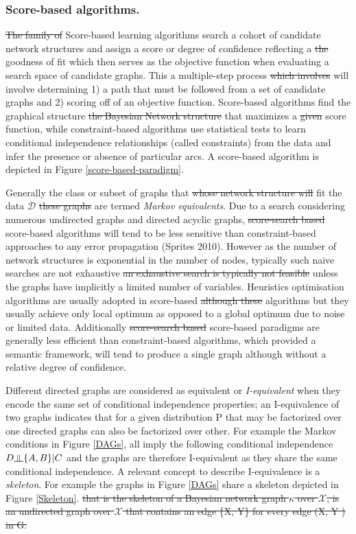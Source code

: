 \documentclass[7pt]{article}
\newcommand{\inperp}{\rotatebox[origin=c]{90}{$\models$}}
\begin{document}
\subsubsection{Score-based  algorithms.}
\st{The family of }Score-based learning algorithms search a cohort of candidate network structures and assign a score or degree of confidence reflecting a \st{the} goodness of fit which then serves as the objective function when evaluating a search space of candidate graphs. This a multiple-step process \st{which involves} will involve determining 1) a path that must be followed from a set of candidate graphs and 2) scoring off of an objective function. Score-based algorithms find the graphical structure  \st{the Bayesian Network structure} that maximizes a \st{given} score function, while constraint-based algorithms use statistical tests to learn conditional independence relationships (called constraints) from the data and infer the presence or absence of particular arcs. A score-based algorithm is depicted in Figure \ref{score-based-paradigm}.

Generally the class or subset of graphs that \st{whose network structure will} fit the data $\mathcal{D}$ \st{these graphs} are termed \emph{Markov equivalents}. Due to a search considering numerous undirected graphs and directed acyclic graphs, \st{score-search based} score-based algorithms will tend to be less sensitive than constraint-based approaches to any error propagation  (Sprites 2010).  However as the number of network structures  is exponential in the number of nodes, typically such naive searches are not exhaustive \st{an exhaustive search is typically not feasible} \cite{harary2014graphical} unless the graphs have implicitly a limited number of variables. Heuristics optimisation algorithms are usually adopted in score-based \st{although these} algorithms but they usually achieve only local optimum as opposed to a global optimum due to noise or limited data.  Additionally \st{score-search based} score-based  paradigms are generally less efficient than constraint-based algorithms, which provided a semantic framework, will tend to produce a single graph although without a relative degree of confidence.

Different directed graphs are considered as equivalent or \emph{I-equivalent} when they encode the same set of conditional independence properties; an I-equivalence of two graphs indicates that for a given distribution P that may be factorized over one directed graphs can also be factorized over other. For example the Markov conditions in Figure \ref{DAGs}, all imply the following conditional independence $D \inperp \{A,B\} | C$ and the graphs are therefore I-equivalent as they share the same conditional independence. A relevant concept to describe I-equivalence is a \emph{skeleton}. For example the graphs in Figure \ref{DAGs} share a skeleton depicted in Figure \ref{Skeleton}. \st{that is the skeleton of a Bayesian network graph $\mathcal{\kappa}$ over $\mathcal{X}$, is an undirected graph over $\mathcal{X}$ that contains an edge \{X, Y\} for every edge (X, Y ) in G.}
		
\end{document}
